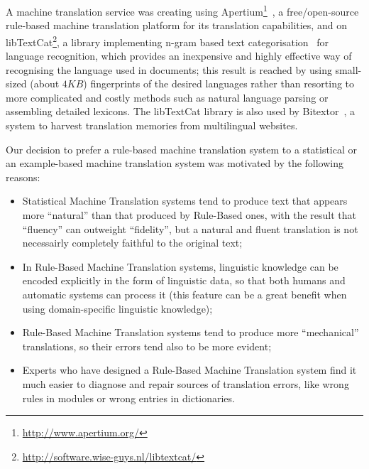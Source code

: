 \documentclass[11pt]{article}
\begin{document}
A machine translation service was creating using Apertium\footnote{\small\url{http://www.apertium.org/}}~\citep{armentano05p}, a free/open-source rule-based machine translation platform for its translation capabilities, and on libTextCat\footnote{\small\url{http://software.wise-guys.nl/libtextcat/}}, a library implementing n-gram based text categorisation~\citep{textcat} for language recognition, which provides an inexpensive and highly effective way of recognising the language used in documents; this result is reached by using small-sized (about $4KB$) fingerprints of the desired languages rather than resorting to more complicated and costly methods such as natural language parsing or assembling detailed lexicons. The libTextCat library is also used by Bitextor~\citep{espla-gomis2009bfs}, a system to harvest translation memories from multilingual websites.



Our decision to prefer a rule-based machine translation system to a statistical or an example-based machine translation system was  motivated by the following reasons:

\begin{itemize}
 \item Statistical Machine Translation systems tend to produce text that appears more ``natural'' than that produced by Rule-Based ones, with the result that ``fluency'' can outweight ``fidelity'', but a natural and fluent translation is not necessairly completely faithful to the original text;
 \item In Rule-Based Machine Translation systems, linguistic knowledge can be encoded explicitly in the form of linguistic data, so that both humans and automatic systems can process it (this feature can be a great benefit when using domain-specific linguistic knowledge);
 \item Rule-Based Machine Translation systems tend to produce more ``mechanical'' translations, so their errors tend also to be more evident;
 \item Experts who have designed a Rule-Based Machine Translation system find it much easier to diagnose and repair sources of translation errors, like wrong rules in modules or wrong entries in dictionaries.
\end{itemize}
\end{document}
